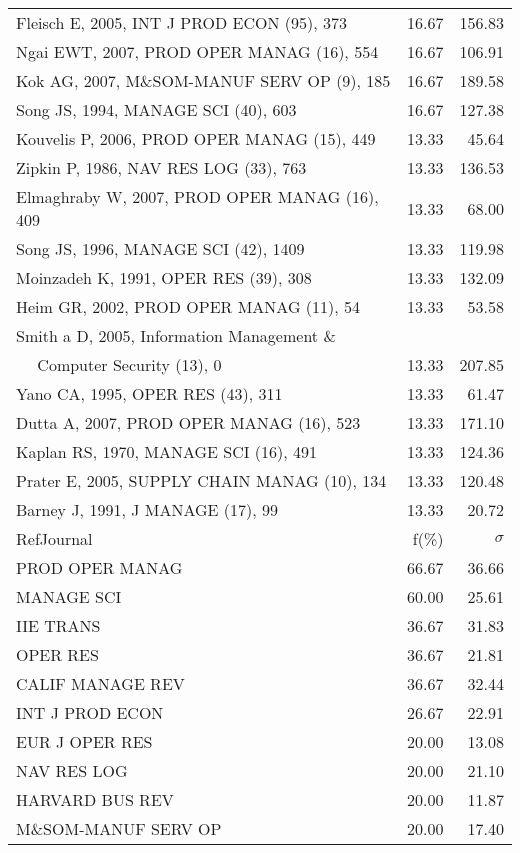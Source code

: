 \documentclass[a4paper,11pt]{report}
\begin{document}
\begin{landscape}
\begin{table}[!ht]
{\begin{tabular}{|l r r|}
Fleisch E, 2005, INT J PROD ECON (95), 373 & 16.67 & 156.83\\
Ngai EWT, 2007, PROD OPER MANAG (16), 554 & 16.67 & 106.91\\
Kok AG, 2007, M\&SOM-MANUF SERV OP (9), 185 & 16.67 & 189.58\\
Song JS, 1994, MANAGE SCI (40), 603 & 16.67 & 127.38\\
Kouvelis P, 2006, PROD OPER MANAG (15), 449 & 13.33 & 45.64\\
Zipkin P, 1986, NAV RES LOG (33), 763 & 13.33 & 136.53\\
Elmaghraby W, 2007, PROD OPER MANAG (16), 409 & 13.33 & 68.00\\
Song JS, 1996, MANAGE SCI (42), 1409 & 13.33 & 119.98\\
Moinzadeh K, 1991, OPER RES (39), 308 & 13.33 & 132.09\\
Heim GR, 2002, PROD OPER MANAG (11), 54 & 13.33 & 53.58\\
Smith a D, 2005, Information Management \& &  & \\
$\quad$ Computer Security (13), 0 & 13.33 & 207.85\\
Yano CA, 1995, OPER RES (43), 311 & 13.33 & 61.47\\
Dutta A, 2007, PROD OPER MANAG (16), 523 & 13.33 & 171.10\\
Kaplan RS, 1970, MANAGE SCI (16), 491 & 13.33 & 124.36\\
Prater E, 2005, SUPPLY CHAIN MANAG (10), 134 & 13.33 & 120.48\\
Barney J, 1991, J MANAGE (17), 99 & 13.33 & 20.72\\
\hline
\hline
RefJournal & f(\%) & $\sigma$\\
\hline
PROD OPER MANAG & 66.67 & 36.66\\
MANAGE SCI & 60.00 & 25.61\\
IIE TRANS & 36.67 & 31.83\\
OPER RES & 36.67 & 21.81\\
CALIF MANAGE REV & 36.67 & 32.44\\
INT J PROD ECON & 26.67 & 22.91\\
EUR J OPER RES & 20.00 & 13.08\\
NAV RES LOG & 20.00 & 21.10\\
HARVARD BUS REV & 20.00 & 11.87\\
M\&SOM-MANUF SERV OP & 20.00 & 17.40\\
\hline
\end{tabular}
}
\end{table}


\end{landscape}
\end{document}
